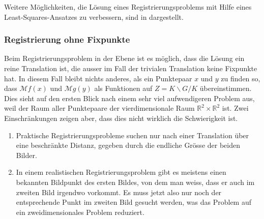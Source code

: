 Weitere Möglichkeiten, die Lösung eines Registrierungsproblems mit
Hilfe eines Least-Squares-Ansatzes zu verbessern, sind in
\cite[chapter 3]{buch:reg} dargestellt.

%
%
\subsubsection{Registrierung ohne Fixpunkte}
Beim Registrierungsproblem in der Ebene ist es möglich, dass die
Lösung ein reine Translation ist, die ausser im Fall der trivialen
Translation keine Fixpunkte hat.
In diesem Fall bleibt nichts anderes, als ein Punktepaar $x$ und $y$
zu finden so, dass $\mathcal{M}f(x)$ und $\mathcal{M}g(y)$ als Funktionen
auf $Z=K\backslash G/K$ übereinstimmen.
Dies sieht auf den ersten Blick nach einem sehr viel aufwendigeren
Problem aus, weil der Raum aller Punktepaare der vierdimensionale
Raum $\mathbb{R}^2\times\mathbb{R}^2$ ist.
Zwei Einschränkungen zeigen aber, dass dies nicht wirklich die
Schwierigkeit ist.
\begin{enumerate}
\item
Praktische Registrierungsprobleme suchen nur nach einer Translation
über eine beschränkte Distanz, gegeben durch die endliche Grösse 
der beiden Bilder.
\item
In einem realistischen Registrierungsproblem gibt es meistens einen
bekannten Bildpunkt des ersten Bildes, von dem man weiss, dass er auch
im zweiten Bild irgendwo vorkommt.
Es muss jetzt also nur noch der entsprechende Punkt im zweiten Bild
gesucht werden, was das Problem auf ein zweidimensionales Problem
reduziert.
\end{enumerate}



